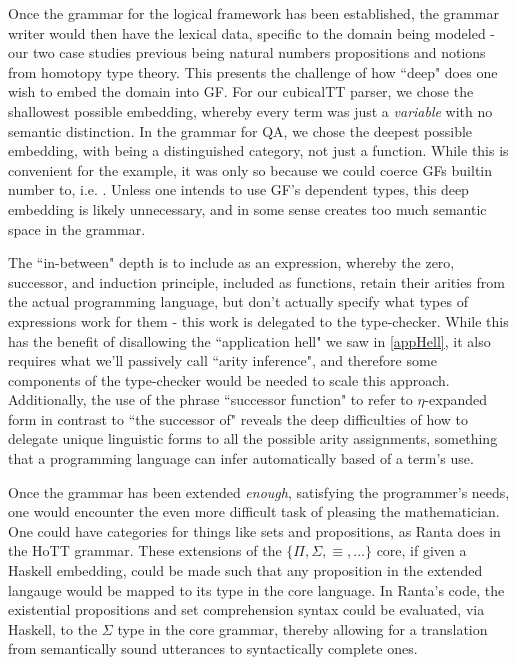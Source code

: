 Once the grammar for the logical framework has been established, the grammar
writer would then have the lexical data, specific to the domain being modeled -
our two case studies previous being natural numbers propositions and
notions from homotopy type theory.  This presents the challenge of how ``deep"
does one wish to embed the domain into GF. For our cubicalTT parser, we chose
the shallowest possible embedding, whereby every term was just a \emph{variable}
with no semantic distinction. In the grammar for QA, we chose the deepest
possible embedding, with  being a distinguished category, not just
a function. While this is convenient for the example, it was only so because
we could coerce GFs builtin number to, i.e. . Unless one
intends to use GF's dependent types, this deep embedding is likely unnecessary,
and in some sense creates too much semantic space in the grammar.

The ``in-between" depth is to include  as an expression, whereby the
zero, successor, and induction principle, included as functions, retain their
arities from the actual programming language, but don't actually specify what
types of expressions work for them - this work is delegated to the type-checker.
While this has the benefit of disallowing the ``application hell" we saw in
\ref{appHell}, it also requires what we'll passively call ``arity inference",
and therefore some components of the type-checker would be needed to scale this
approach. Additionally, the use of the phrase ``successor function" to refer to
$\eta$-expanded form in contrast to ``the successor of" reveals the deep
difficulties of how to delegate unique linguistic forms to all the possible
arity assignments, something that a programming language can infer automatically
based of a term's use.

Once the grammar has been extended \emph{enough}, satisfying the programmer's
needs, one would encounter the even more difficult task of pleasing the
mathematician. One could have categories for things like sets and propositions,
as Ranta does in the HoTT grammar. These extensions of the
$\{\Pi,\Sigma,\equiv,...\}$ core, if given a Haskell embedding, could be made
such that any proposition in the extended langauge would be mapped to its type
in the core language. In Ranta's code, the existential propositions and set
comprehension syntax could be evaluated, via Haskell, to the $\Sigma$ type in
the core grammar, thereby allowing for a translation from semantically sound
utterances to syntactically complete ones.

